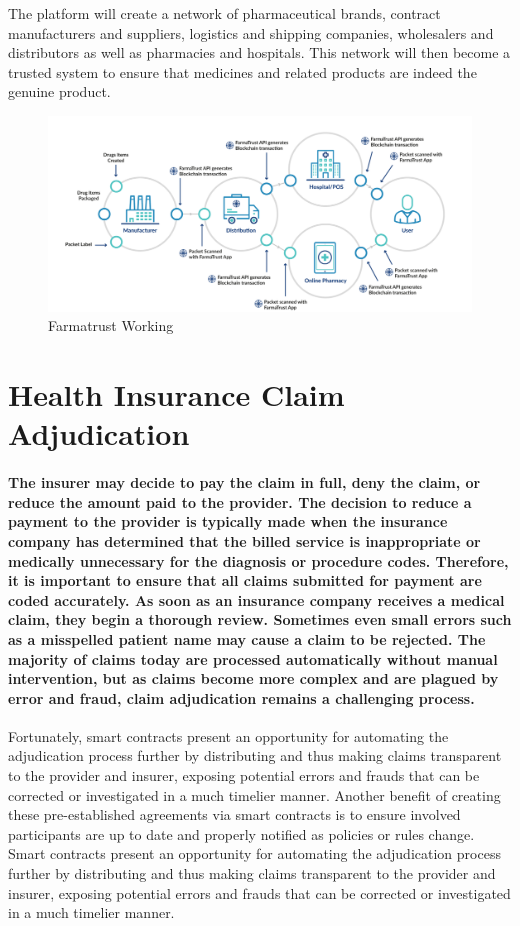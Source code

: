 \documentclass[12pt]{report}
\begin{document}
The platform will create a network of pharmaceutical brands, contract manufacturers and suppliers, logistics and shipping companies, wholesalers and distributors as well as pharmacies and hospitals. This network will then become a trusted system to ensure that medicines and related products are indeed the genuine product.
\begin{figure}[H]
\centering
\includegraphics[width=1.0\textwidth]{farma.png}
\caption{Farmatrust Working}
\label{farmatrust}
\end{figure}


\section{Health Insurance Claim Adjudication}
\paragraph{The insurer may decide to pay the claim in full, deny the claim, or reduce the amount
paid to the provider. The decision to reduce a payment to the provider is typically made when
the insurance company has determined that the billed service is inappropriate or medically
unnecessary for the diagnosis or procedure codes. Therefore, it is important to ensure that all
claims submitted for payment are coded accurately. As soon as an insurance company receives a medical claim, they begin a thorough review. Sometimes even small errors such as a misspelled patient name may cause a claim to be rejected. The majority of claims today
are processed automatically without manual intervention, but as claims become more complex and are plagued by error and fraud, claim adjudication remains a challenging process.}

\par Fortunately, smart contracts present
an opportunity for automating the adjudication process further by distributing and thus making claims transparent to the provider and insurer, exposing potential errors and frauds that
can be corrected or investigated in a much timelier manner. Another benefit of creating these
pre-established agreements via smart contracts is to ensure involved participants are up to date and properly notified as policies or rules change.
Smart contracts present
an opportunity for automating the adjudication process further by distributing and thus making claims transparent to the provider and insurer, exposing potential errors and frauds that
can be corrected or investigated in a much timelier manner.
\end{document}
